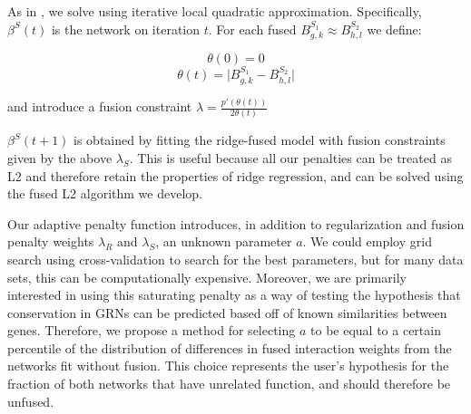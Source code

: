 \documentclass[11pt]{article}
\begin{document}

    
As in \cite{fan2001variable}, we solve using iterative local quadratic approximation. Specifically, $\beta^S(t)$ is the network on iteration $t$. For each fused $B^{S_1}_{g,k} \approx B^{S_2}_{h,l}$ we define:

\begin{equation} 
\theta(0)=0
\end{equation}
\begin{equation}
\theta(t) = \vert B^{S_1}_{g,k} - B^{S_2}_{h,l} \vert
\end{equation}

and introduce a fusion constraint $\lambda = \frac{p'(\theta(t))}{2\theta(t)} $

$\beta^S(t+1)$ is obtained by fitting the ridge-fused model with fusion constraints given by the above $\lambda_S$. This is useful because all our penalties can be treated as L2 and therefore retain the properties of ridge regression, and can be solved using the fused L2 algorithm we develop.

Our adaptive penalty function introduces, in addition to regularization and fusion penalty weights $\lambda_R$ and $\lambda_S$, an unknown parameter $a$. We could employ grid search using cross-validation to search for the best parameters, but for many data sets, this can be computationally expensive. Moreover, we are primarily interested in using this saturating penalty as a way of testing the hypothesis that conservation in GRNs can be predicted based off of known similarities between genes. Therefore, we propose a method for selecting $a$ to be equal to a certain percentile of the distribution of differences in fused interaction weights from the networks fit without fusion. This choice represents the user's hypothesis for the fraction of both networks that have unrelated function, and should therefore be unfused. 
\end{document}

